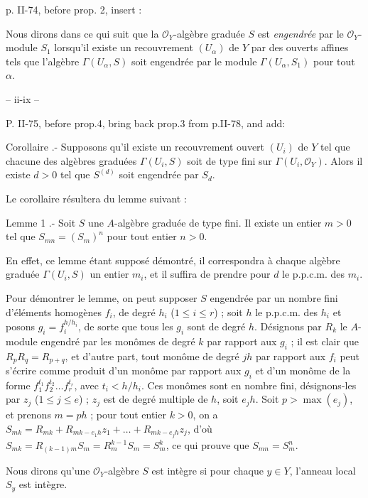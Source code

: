 p. II-74, before prop. 2, insert :

Nous dirons dans ce qui suit que la $\mathcal{O}_Y$-algèbre graduée $S$ est \emph{engendrée} par le $\mathcal{O}_Y$-module $S_1$ lorsqu'il existe un recouvrement $(U_\alpha)$ de $Y$ par des ouverts affines tels que l'algèbre $\Gamma(U_\alpha, S)$ soit engendrée par le module $\Gamma(U_\alpha, S_1)$ pour tout $\alpha$.

\newpage


-- ii-ix --

P. II-75, before prop.4, bring back prop.3 from p.II-78, and add:

Corollaire .- Supposons qu'il existe un recouvrement ouvert $(U_i)$ de $Y$ tel que chacune des algèbres graduées $\Gamma(U_i, S)$ soit de type fini sur $\Gamma(U_i, \mathcal{O}_Y)$. Alors il existe $d>0$ tel que $S^{(d)}$ soit engendrée par $S_d$.

Le corollaire résultera du lemme suivant :

Lemme 1 .- Soit $S$ une $A$-algèbre graduée de type fini. Il existe un entier $m > 0$ tel que $S_{mn} = (S_m)^n$ pour tout entier $n > 0$.

En effet, ce lemme étant supposé démontré, il correspondra à chaque algèbre graduée $\Gamma(U_i, S)$ un entier $m_i$, et il suffira de prendre pour $d$ le p.p.c.m. des $m_i$.

Pour démontrer le lemme, on peut supposer $S$ engendrée par un nombre fini d'éléments homogènes $f_i$, de degré $h_i$ ($1 \le i \le r$) ; soit $h$ le p.p.c.m. des $h_i$ et posons $g_i = f_i^{h/h_i}$, de sorte que tous les $g_i$ sont de degré $h$. Désignons par $R_k$ le $A$-module engendré par les monômes de degré $k$ par rapport aux $g_i$ ; il est clair que $R_p R_q = R_{p+q}$, et d'autre part, tout monôme de degré $jh$ par rapport aux $f_i$ peut s'écrire comme produit d'un monôme par rapport aux $g_i$ et d'un monôme de la forme $f_1^{t_1} f_2^{t_2} \dots f_r^{t_r}$, avec $t_i < h/h_i$. Ces monômes sont en nombre fini, désignons-les par $z_j$ ($1 \le j \le e$) ; $z_j$ est de degré multiple de $h$, soit $e_j h$. Soit $p > \max(e_j)$, et prenons $m = ph$ ; pour tout entier $k > 0$, on a $S_{mk} = R_{mk} + R_{mk-e_1 h} z_1 + \dots + R_{mk-e_j h} z_j$, d'où $S_{mk} = R_{(k-1)m} S_m = R_{m}^{k-1} S_m = S_m^k$, ce qui prouve que $S_{mn} = S_m^n$.

Nous dirons qu'une $\mathcal{O}_Y$-algèbre $S$ est intègre si pour chaque $y \in Y$, l'anneau local $S_y$ est intègre.

